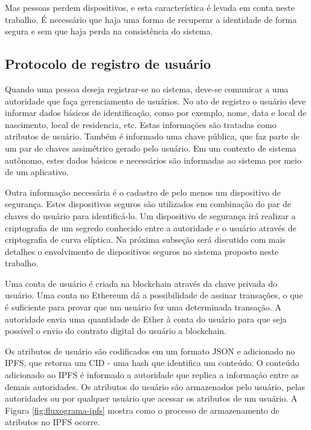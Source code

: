 \documentclass[tcc,capa]{texufpel}
\begin{document}
    Mas pessoas perdem dispositivos, e esta característica é levada em conta neste trabalho. É necessário que haja uma forma de recuperar a identidade de forma segura e sem que haja perda na consistência do sistema.
    
    \subsection{Protocolo de registro de usuário}
    
        Quando uma pessoa deseja registrar-se no sistema, deve-se comunicar a uma autoridade que faça gerenciamento de usuários. No ato de registro o usuário deve informar dados básicos de identificação, como por exemplo, nome, data e local de nascimento, local de residencia, etc. Estas informações são tratadas como atributos de usuário. Também é informado uma chave pública, que faz parte de um par de chaves assimétrico gerado pelo usuário. Em um contexto de sistema autônomo, estes dados básicos e necessários são informadas ao sistema por meio de um aplicativo.
        
        Outra informação necessária é o cadastro de pelo menos um dispositivo de segurança. Estes dispositivos seguros são utilizados em combinação do par de chaves do usuário para identificá-lo. Um dispositivo de segurança irá realizar a criptografia de um segredo conhecido entre a autoridade e o usuário através de criptografia de curva elíptica. Na próxima subseção será discutido com mais detalhes o envolvimento de dispositivos seguros no sistema proposto neste trabalho.
        
        Uma conta de usuário é criada na blockchain através da chave privada do usuário. Uma conta no Ethereum dá a possibilidade de assinar transações, o que é suficiente para provar que um usuário fez uma determinada transação. A autoridade envia uma quantidade de Ether à conta do usuário para que seja possível o envio do contrato digital do usuário a blockchain.
        
        Os atributos de usuário são codificados em um formato JSON e adicionado no IPFS, que retorna um CID - uma hash que identifica um conteúdo. O conteúdo adicionado ao IPFS é informado a autoridade que replica a informação entre as demais autoridades. Os atributos do usuário são armazenados pelo usuário, pelas autoridades ou por qualquer usuário que acessar os atributos de um usuário. A Figura \ref{fig:fluxograma-ipfs} mostra como o processo de armazenamento de atributos no IPFS ocorre.
        
\end{document}

